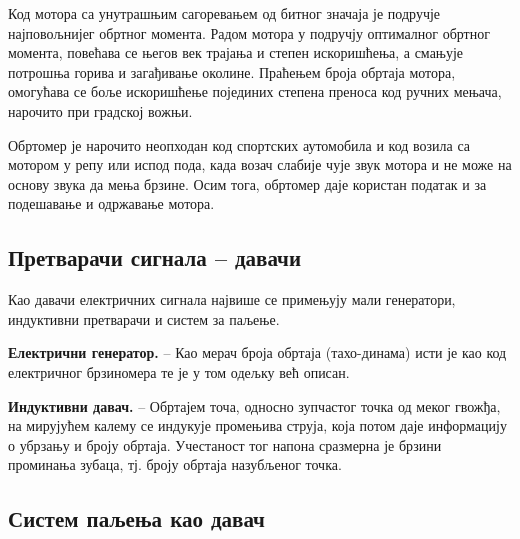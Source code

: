 \documentclass{report}
\begin{document}
Код мотора са унутрашњим сагоревањем од битног значаја је подручје најповољнијег обртног момента. Радом мотора у 
подручју оптималног обртног момента, повећава се његов век трајања и степен искоришћења, а смањује потрошња горива и 
загађивање околине. Праћењем броја обртаја мотора, омогућава се боље искоришћење појединих степена преноса код ручних мењача, 
нарочито при градској вожњи.

Обртомер је нарочито неопходан код спортских аутомобила и код возила са мотором у репу или испод пода, када возач слабије 
чује звук мотора и не може на основу звука да мења брзине. Осим тога, обртомер даје користан податак и за подешавање и одржавање мотора.

\subsection{Претварачи сигнала – давачи}

Као давачи електричних сигнала највише се примењују мали генератори, индуктивни претварачи и систем за паљење.

\textbf{Електрични генератор.} – Као мерач броја обртаја (тахо-динама) исти је као код електричног брзиномера те је у том одељку већ описан.

\textbf{Индуктивни давач.} – Обртајем точа, односно зупчастог точка од меког гвожђа, на мирујућем калему
се индукује промењива струја, која потом даје информацију о убрзању и броју обртаја.
Учестаност тог напона сразмерна је брзини проминања зубаца, тј. броју обртаја назубљеног точка.




\subsection{Систем паљења као давач}
\end{document}
